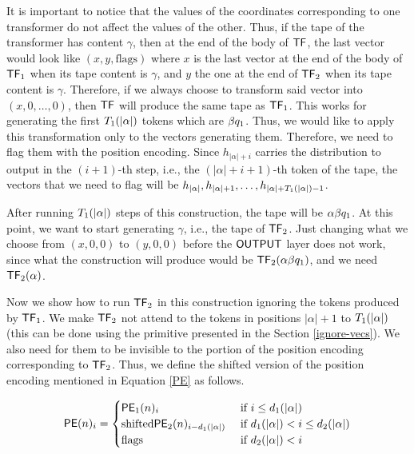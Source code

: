 It is important to notice that the values of the coordinates corresponding to one transformer do not affect the values of the other.
Thus, if the tape of the transformer has content $\gamma$, then at the end of the body of $\mathsf{TF}$, the last vector would look like $(x, y, \text{flags})$ where $x$ is the last vector at the end of the body of ${\mathsf{TF}}_1$ when its tape content is $\gamma$, and $y$ the one at the end of ${\mathsf{TF}}_2$ when its tape content is $\gamma$.
Therefore, if we always choose to transform said vector into $(x, 0, \dots, 0)$, then $\mathsf{TF}$ will produce the same tape as ${\mathsf{TF}}_1$.
This works for generating the first ${T}_1(|\alpha|)$ tokens which are $\beta {q}_1$.
Thus, we would like to apply this transformation only to the vectors generating them.
Therefore, we need to flag them with the position encoding.
Since $h_{|\alpha| + i}$ carries the distribution to output in the $(i+1)$-th step, i.e., the $(|\alpha| + i + 1)$-th token of the tape, the vectors that we need to flag will be $h_{|\alpha|}, h_{|\alpha|+1}, \dots, h_{|\alpha|+{T}_1(|\alpha|)-1}$.

\smallskip

After running ${T}_1(|\alpha|)$ steps of this construction, the tape will be $\alpha \beta {q}_1$.
At this point, we want to start generating $\gamma$, i.e., the tape of ${\mathsf{TF}}_2$.
Just changing what we choose from $(x, 0, 0)$ to $(y, 0, 0)$ before the $\mathsf{OUTPUT}$ layer does not work, since what the construction will produce would be ${\mathsf{TF}}_2(\alpha \beta {q}_1)$, and we need ${\mathsf{TF}}_2(\alpha)$.


\medskip

Now we show how to run ${\mathsf{TF}}_2$ in this construction ignoring the tokens produced by ${\mathsf{TF}}_1$.
We make ${\mathsf{TF}}_2$ not attend to the tokens in positions $|\alpha| + 1$ to ${T}_1(|\alpha|)$ (this can be done using the primitive presented in the Section \ref{ignore-vecs}).
We also need for them to be invisible to the portion of the position encoding corresponding to ${\mathsf{TF}}_2$.
Thus, we define the shifted version of the position encoding mentioned in Equation \ref{PE} as follows.

\[
\mathsf{PE}(n)_i = \begin{cases}
    {\mathsf{PE}}_1(n)_i                                        &\text{ if } i \leq {d}_1(|\alpha|) \\
    \text{shifted}{\mathsf{PE}}_2(n)_{i-{d}_1(|\alpha|)}    &\text{ if } {d}_1(|\alpha|) < i \leq {d}_2(|\alpha|) \\
    \text{flags}                                            &\text{ if } {d}_2(|\alpha|) < i\\
\end{cases}
\]

